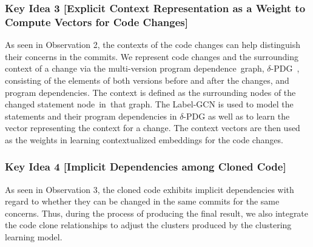 

\subsubsection{Key Idea 3 [Explicit Context Representation as a Weight to
    Compute Vectors for Code Changes]}

As seen in Observation 2, the contexts of the code changes can help
distinguish their concerns in the commits. We represent code changes
and the surrounding context of a change via the multi-version program
dependence~graph, $\delta$-PDG~\cite{flexeme-fse20}, consisting of the
elements of both versions before and after the changes, and program
dependencies. The context is defined as the surrounding nodes of the
changed statement node~in~that graph. The Label-GCN is used to model
the statements and their program dependencies in $\delta$-PDG as well
as to learn the vector representing the context for a change. The
context vectors are then used as the weights in learning
contextualized embeddings for the code changes.


\subsubsection{Key Idea 4 [Implicit Dependencies among Cloned Code]}

As seen in Observation 3, the cloned code exhibits implicit
dependencies with regard to whether they can be changed in the same
commits for the same concerns. Thus, during the process of producing
the final result, we also integrate the code clone relationships to
adjust the clusters produced by the clustering learning model.

